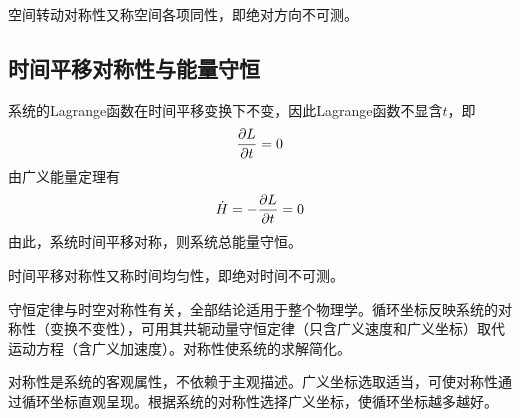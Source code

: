 空间转动对称性又称{\heiti 空间各项同性}，即绝对方向不可测。

\subsection{时间平移对称性与能量守恒}

系统的Lagrange函数在时间平移变换下不变，因此Lagrange函数不显含$t$，即
\begin{equation*}
	\frac{\partial L}{\partial t} = 0
\end{equation*}
由广义能量定理有
\begin{equation*}
	\dot{H} = -\frac{\partial L}{\partial t} = 0
\end{equation*}
由此，系统时间平移对称，则系统总能量守恒。

时间平移对称性又称{\heiti 时间均匀性}，即绝对时间不可测。

守恒定律与时空对称性有关，全部结论适用于整个物理学。循环坐标反映系统的对称性（变换不变性），可用其共轭动量守恒定律（只含广义速度和广义坐标）取代运动方程（含广义加速度）。对称性使系统的求解简化。

对称性是系统的客观属性，不依赖于主观描述。广义坐标选取适当，可使对称性通过循环坐标直观呈现。根据系统的对称性选择广义坐标，使循环坐标越多越好。

